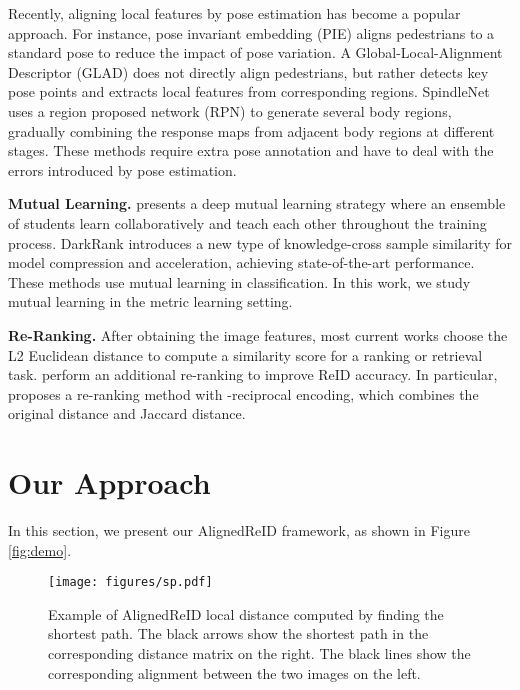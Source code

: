 \documentclass[10pt,twocolumn,letterpaper]{article}
\begin{document}
Recently, aligning local features by pose estimation has become a popular approach.
For instance, pose invariant embedding (PIE) aligns pedestrians to a standard pose to reduce the impact of pose \cite{zheng2017pose} variation.
A Global-Local-Alignment Descriptor (GLAD) \cite{wei2017glad} does not directly align pedestrians, but rather detects key pose points and extracts local features from corresponding regions.
SpindleNet \cite{zhao2017spindle} uses a region proposed network (RPN) to generate several body regions, gradually combining the response maps from adjacent body regions at different stages. These methods require extra pose annotation and have to deal with the errors introduced by pose estimation.

\noindent \textbf{Mutual Learning.}
\cite{zhang2017deep} presents a deep mutual learning strategy where an ensemble of students learn collaboratively and teach each other throughout the training process.
DarkRank \cite{chen2017darkrank} introduces a new type of knowledge-cross sample similarity for model compression and acceleration, achieving state-of-the-art performance.
These methods use mutual learning in classification.
In this work, we study mutual learning in the metric learning setting.

\noindent \textbf{Re-Ranking.}
After obtaining the image features, most current works choose the L2 Euclidean distance to compute a similarity score for a ranking or retrieval task. \cite{wang2017deep, zhong2017re, bai2017scalable} perform an additional re-ranking to improve ReID accuracy.
In particular, \cite{zhong2017re} proposes a re-ranking method with -reciprocal encoding, which combines the original distance and Jaccard distance.

\section{Our Approach}
\label{method}
In this section, we present our AlignedReID framework, as shown in Figure \ref{fig:demo}.

\begin{figure}[tb]
\centering
\texttt{[image: figures/sp.pdf]}
\caption{Example of AlignedReID local distance computed by finding the shortest path.
The black arrows show the shortest path in the corresponding distance matrix on the right.
The black lines show the corresponding alignment between the two images on the left.}
\label{fig:ShortestPath}
\end{figure}
\end{document}
